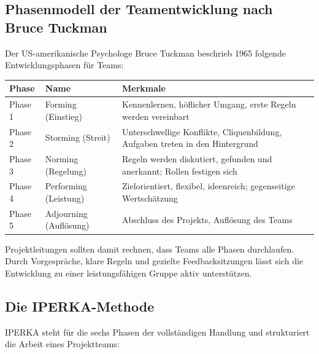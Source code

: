 \documentclass[11pt, a4paper]{article}
\begin{document}
\subsection{Phasenmodell der Teamentwicklung nach Bruce Tuckman}

Der US-amerikanische Psychologe Bruce Tuckman beschrieb 1965 folgende Entwicklungsphasen für Teams:

\begin{center}
\begin{tabular}{p{2.5cm} p{3.5cm} p{7cm}}
\toprule
\textbf{Phase} & \textbf{Name} & \textbf{Merkmale}\\
\midrule
Phase 1 & Forming (Einstieg) & Kennenlernen, höflicher Umgang, erste Regeln werden vereinbart\\
\addlinespace
Phase 2 & Storming (Streit) & Unterschwellige Konflikte, Cliquenbildung, Aufgaben treten in den Hintergrund\\
\addlinespace
Phase 3 & Norming (Regelung) & Regeln werden diskutiert, gefunden und anerkannt; Rollen festigen sich\\
\addlinespace
Phase 4 & Performing (Leistung) & Zielorientiert, flexibel, ideen­reich; gegenseitige Wertschätzung\\
\addlinespace
Phase 5 & Adjourning (Auflösung) & Abschluss des Projekts, Auflösung des Teams\\
\bottomrule
\end{tabular}
\end{center}

\begin{merksatz}[title={\bfseries Merke: Teamphasen bewusst begleiten}]
Projektleitungen sollten damit rechnen, dass Teams alle Phasen durchlaufen. Durch Vorgespräche,
klare Regeln und gezielte Feedbacksitzungen lässt sich die Entwicklung zu einer leistungsfähigen
Gruppe aktiv unterstützen.
\end{merksatz}

\subsection{Die IPERKA-Methode}

IPERKA steht für die sechs Phasen der vollständigen Handlung und strukturiert die Arbeit eines
Projektteams:
\end{document}
